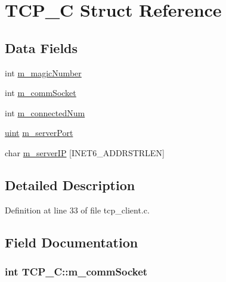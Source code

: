 \hypertarget{structTCP__C}{}\section{T\+C\+P\+\_\+C Struct Reference}
\label{structTCP__C}
\subsection*{Data Fields}
\begin{DoxyCompactItemize}
\item 
int \hyperlink{structTCP__C_adf0671722de576cd121c7bfc2e697684}{m\+\_\+magic\+Number}
\item 
int \hyperlink{structTCP__C_a122db7a705876954e3ee43f84c7fdaf8}{m\+\_\+comm\+Socket}
\item 
int \hyperlink{structTCP__C_a07ecf4419608c6736a19537b2ee2c47d}{m\+\_\+connected\+Num}
\item 
\hyperlink{tcp_8h_a91ad9478d81a7aaf2593e8d9c3d06a14}{uint} \hyperlink{structTCP__C_ae5dea2bd422b4cefb22b5ce2ab082b4d}{m\+\_\+server\+Port}
\item 
char \hyperlink{structTCP__C_abe2e28275eb3968d7939b58901d62d9d}{m\+\_\+server\+IP} \mbox{[}I\+N\+E\+T6\+\_\+\+A\+D\+D\+R\+S\+T\+R\+L\+EN\mbox{]}
\end{DoxyCompactItemize}


\subsection{Detailed Description}


Definition at line 33 of file tcp\+\_\+client.\+c.



\subsection{Field Documentation}
\subsubsection[{\texorpdfstring{m\+\_\+comm\+Socket}{m_commSocket}}]{\setlength{\rightskip}{0pt plus 5cm}int T\+C\+P\+\_\+\+C\+::m\+\_\+comm\+Socket}\hypertarget{structTCP__C_a122db7a705876954e3ee43f84c7fdaf8}{}\label{structTCP__C_a122db7a705876954e3ee43f84c7fdaf8}


